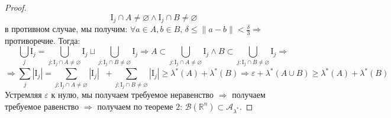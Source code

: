 \documentclass[12pt]{article}
\newcommand{\MR}{\mathbb{R}}
\newcommand{\MI}{\mathrm{I}}
\newcommand{\MA}{\mathcal{A}}
\newcommand{\MB}{\mathcal{B}}
\newcommand{\VN}{\varnothing}
\newcommand{\VE}{\varepsilon}
\theoremstyle{definition}
\newcommand{\ddsum}[2]{\displaystyle\sum\limits_{#1}^{#2}}
\begin{document}
\begin{proof}
	$$
		\MI_j \cap A \neq \VN \wedge \MI_j \cap B \neq \VN
	$$
	в противном случае, мы получим: $\forall a \in A, b \in B, \, \delta \leq \|a - b \| < \tfrac{\delta}{3} \Rightarrow$ противоречие. Тогда:
	$$
		\bigcup\limits_j \MI_j = \bigcup\limits_{j \colon \MI_j \cap A \neq \VN} \MI_j \sqcup  \bigcup\limits_{j \colon \MI_j \cap B \neq \VN} \MI_j \Rightarrow A \subset \bigcup\limits_{j \colon \MI_j \cap A \neq \VN} \MI_j \wedge B \subset \bigcup\limits_{j \colon \MI_j \cap B \neq \VN} \MI_j \Rightarrow
	$$
	$$
		\Rightarrow \ddsum{j}{}|\MI_j| = \ddsum{j \colon \MI_j \cap A \neq \VN}{}|\MI_j| \;\; + \ddsum{j \colon \MI_j \cap B \neq \VN}{}|\MI_j| \geq \lambda^*(A) + \lambda^*(B) \Rightarrow \VE + \lambda^*(A \cup B) \geq \lambda^*(A) + \lambda^*(B)
	$$
	Устремляя $\VE$ к нулю, мы получаем требуемое неравенство $\Rightarrow$ получаем требуемое равенство $\Rightarrow$ получаем по теореме $2$: $\MB(\MR^n) \subset \MA_{\lambda^*}$.
\end{proof}
\end{document}
